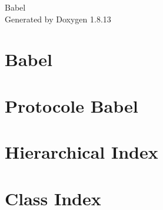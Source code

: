 \documentclass[twoside]{book}
\newcommand{\+}{\discretionary{\mbox{\scriptsize$\hookleftarrow$}}{}{}}
\newcommand{\clearemptydoublepage}{%
  \newpage{\pagestyle{empty}\cleardoublepage}%
}
\begin{document}
\hypersetup{pageanchor=false,
             bookmarksnumbered=true,
             pdfencoding=unicode
            }
\begin{titlepage}
\vspace*{7cm}
\begin{center}%
{\Large Babel }\\
\vspace*{1cm}
{\large Generated by Doxygen 1.8.13}\\
\end{center}
\end{titlepage}
\clearemptydoublepage
{}
\tableofcontents
\clearemptydoublepage
{}
\hypersetup{pageanchor=true}

\chapter{Babel}
\label{md__r_e_a_d_m_e}

\chapter{Protocole Babel}
\label{md__t_c_p__procol}

\chapter{Hierarchical Index}

\chapter{Class Index}

\end{document}
